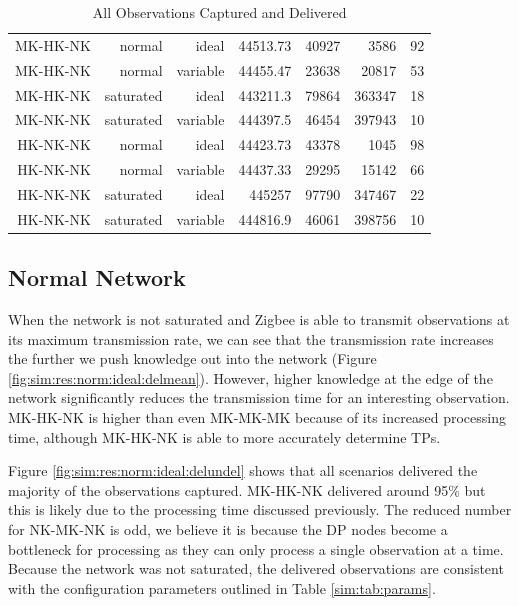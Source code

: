 \begin{landscape}
\begin{table}[htbp]
\begin{tabular}{rrrrrrr}
\rowcolor{Gray}
    MK-HK-NK & normal & ideal & 44513.73 & 40927 & 3586  & 92 \\
\rowcolor{Gray}
    MK-HK-NK & normal & variable & 44455.47 & 23638 & 20817 & 53 \\
\rowcolor{Gray}
    MK-HK-NK & saturated & ideal & 443211.3 & 79864 & 363347 & 18 \\
\rowcolor{Gray}
    MK-NK-NK & saturated & variable & 444397.5 & 46454 & 397943 & 10 \\
    HK-NK-NK & normal & ideal & 44423.73 & 43378 & 1045  & 98 \\
    HK-NK-NK & normal & variable & 44437.33 & 29295 & 15142 & 66 \\
    HK-NK-NK & saturated & ideal & 445257 & 97790 & 347467 & 22 \\
    HK-NK-NK & saturated & variable & 444816.9 & 46061 & 398756 & 10 \\
    \bottomrule

    \end{tabular}%
    \caption{All Observations Captured and Delivered}
\end{table}%
\label{tab:delnum}%
\end{landscape}

\subsection{Normal Network}

When the network is not saturated and Zigbee is able to transmit observations at its maximum transmission rate, we can see that the transmission rate increases the further we push knowledge out into the network (Figure \ref{fig:sim:res:norm:ideal:delmean}). However, higher knowledge at the edge of the network significantly reduces the transmission time for an interesting observation. MK-HK-NK is higher than even MK-MK-MK because of its increased processing time, although MK-HK-NK is able to more accurately determine TPs.

Figure \ref{fig:sim:res:norm:ideal:delundel} shows that all scenarios delivered the majority of the observations captured. MK-HK-NK delivered around 95\% but this is likely due to the processing time discussed previously. The reduced number for NK-MK-NK is odd, we believe it is because the DP nodes become a bottleneck for processing as they can only process a single observation at a time. Because the network was not saturated, the delivered observations are consistent with the configuration parameters outlined in Table \ref{sim:tab:params}.

